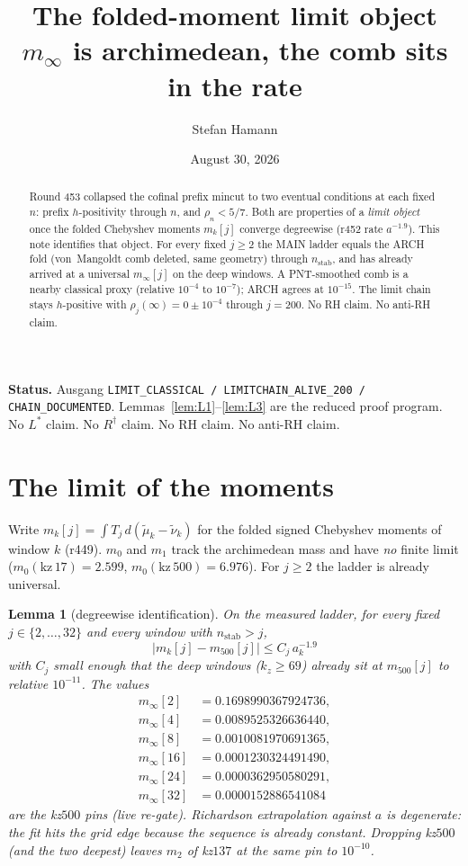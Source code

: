 \documentclass[11pt]{article}
\title{\bfseries The folded-moment limit object\\[2mm]
\large $m_\infty$ is archimedean, the comb sits in the rate}
\author{Stefan Hamann}
\date{August 30, 2026}
\newtheorem{lemma}{Lemma}
\begin{document}
\maketitle

\begin{abstract}\noindent
Round 453 collapsed the cofinal prefix mincut
to two eventual conditions at each fixed $n$:
prefix $h$-positivity through $n$, and
$\rho_n<5/7$.
Both are properties of a \emph{limit object}
once the folded Chebyshev moments $m_k[j]$
converge degreewise (r452 rate $a^{-1.9}$).
This note identifies that object.
For every fixed $j\ge 2$ the MAIN ladder
equals the ARCH fold (von~Mangoldt comb
deleted, same geometry) through $n_{\mathrm{stab}}$,
and has already arrived at a universal
$m_\infty[j]$ on the deep windows.
A PNT-smoothed comb is a nearby classical
proxy (relative $10^{-4}$ to $10^{-7}$);
ARCH agrees at $10^{-15}$.
The limit chain stays $h$-positive with
$\rho_j(\infty)=0\pm 10^{-4}$ through
$j=200$.
No RH claim.  No anti-RH claim.
\end{abstract}

\medskip\noindent
\textbf{Status.}\enspace
Ausgang
\texttt{LIMIT\_CLASSICAL / LIMITCHAIN\_ALIVE\_200 / CHAIN\_DOCUMENTED}.
Lemmas~\ref{lem:L1}--\ref{lem:L3} are the
reduced proof program.
No $L^{*}$ claim.  No $R^{\dagger}$ claim.
No RH claim.  No anti-RH claim.

\section{The limit of the moments}\label{sec:A}

Write $m_k[j]=\int T_j\,d(\tilde\mu_k-\tilde\nu_k)$
for the folded signed Chebyshev moments of
window $k$ (r449).
$m_0$ and $m_1$ track the archimedean mass
and have \emph{no} finite limit
($m_0(\mathrm{kz}\,17)=2.599$,
$m_0(\mathrm{kz}\,500)=6.976$).
For $j\ge 2$ the ladder is already universal.

\begin{lemma}[degreewise identification]\label{lem:ident}
On the measured ladder, for every fixed
$j\in\{2,\dots,32\}$ and every window with
$n_{\mathrm{stab}}>j$,
\[
\bigl|m_k[j]-m_{500}[j]\bigr|
\le C_j\,a_k^{-1.9}
\]
with $C_j$ small enough that the deep
windows ($k_z\ge 69$) already sit at
$m_{500}[j]$ to relative $10^{-11}$.
The values
\begin{align*}
m_\infty[2]&=0.1698990367924736,\\
m_\infty[4]&=0.0089525326636440,\\
m_\infty[8]&=0.0010081970691365,\\
m_\infty[16]&=0.0001230324491490,\\
m_\infty[24]&=0.0000362950580291,\\
m_\infty[32]&=0.0000152886541084
\end{align*}
are the kz$500$ pins (live re-gate).
Richardson extrapolation against $a$ is
degenerate: the fit hits the grid edge
because the sequence is already constant.
Dropping kz$500$ (and the two deepest)
leaves $m_2$ of kz$137$ at the same pin
to $10^{-10}$.
\end{lemma}
\end{document}
